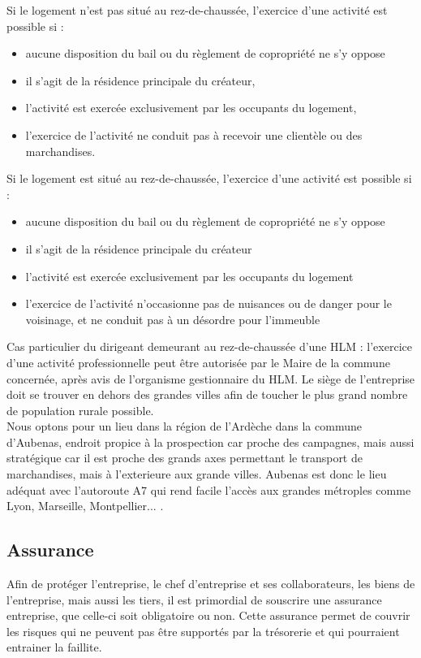 \documentclass[11pt]{article}
\begin{document}
Si le logement n'est pas situé au rez-de-chaussée, l'exercice d'une activité est possible si :
\begin{itemize}
	\item aucune disposition du bail ou du règlement de copropriété ne s'y oppose
	\item il s'agit de la résidence principale du créateur,
	\item l'activité est exercée exclusivement par les occupants du logement,
	\item l'exercice de l'activité ne conduit pas à recevoir une clientèle ou des marchandises.
\end{itemize}

Si le logement est situé au rez-de-chaussée, l'exercice d'une activité est possible  si :
\begin{itemize}
	\item aucune disposition du bail ou du règlement de copropriété ne s'y oppose
	\item il s'agit de la résidence principale du créateur
	\item l'activité est exercée exclusivement par les occupants du logement
	\item l'exercice de l'activité n'occasionne pas de nuisances ou de danger pour le voisinage, et ne conduit pas à un désordre pour l'immeuble \\
\end{itemize}

Cas particulier du dirigeant demeurant au rez-de-chaussée d'une HLM : l'exercice d'une activité professionnelle peut être autorisée par le Maire de la commune concernée, après avis de l'organisme gestionnaire du HLM.
Le siège de l'entreprise doit se trouver en dehors des grandes villes afin de toucher le plus grand nombre de population rurale possible.\\
Nous optons pour un lieu dans la région de l'Ardèche dans la commune d'Aubenas, endroit propice à la prospection car proche des campagnes, mais aussi stratégique car il est proche des grands axes permettant le transport de marchandises, mais à l'exterieure aux grande villes. Aubenas est donc le lieu adéquat avec l'autoroute A7 qui rend facile l'accès aux grandes métroples comme Lyon, Marseille, Montpellier... .\\

\subsection{Assurance}
\label{sub:assurance}
Afin de protéger l'entreprise, le chef d'entreprise et ses collaborateurs, les biens de l'entreprise, mais aussi les tiers, il est primordial de souscrire une assurance entreprise, que celle-ci soit obligatoire ou non. Cette assurance permet de couvrir les risques qui ne peuvent pas être supportés par la trésorerie et qui pourraient entrainer la faillite.
\end{document}
